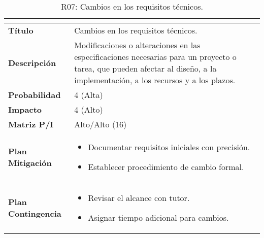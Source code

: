 \begin{table}[H]
\centering
\begin{tabular}{|>{\bfseries}l|p{10cm}|}
\hline
\rowcolor{lightgray}
\multicolumn{2}{|c|}{\textbf{Riesgo R07}} \\ \hline
Título & Cambios en los requisitos técnicos. \\ \hline
Descripción &  Modificaciones o alteraciones en las especificaciones necesarias para un proyecto o tarea, que pueden afectar al diseño, a la implementación, a los recursos y a los plazos. \\ \hline
Probabilidad & 4 (Alta)  \cellcolor{orangerisk}\\ \hline
Impacto & 4 (Alto) \cellcolor{orangerisk}\\ \hline
Matriz P/I & Alto/Alto (16)\\ \hline
Plan Mitigación & 
\begin{itemize}
\item Documentar requisitos iniciales con precisión.
\item Establecer procedimiento de cambio formal.
\end{itemize} \\ \hline
Plan Contingencia & 
\begin{itemize}
\item Revisar el alcance con tutor.
\item Asignar tiempo adicional para cambios.
\end{itemize} \\ \hline
\end{tabular}
\caption{R07: Cambios en los requisitos técnicos.}
\label{tab:R07}
\end{table}

